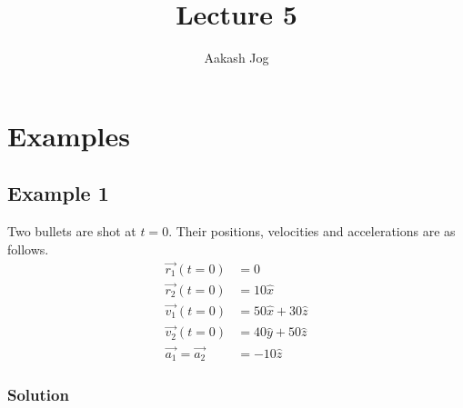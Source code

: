 \documentclass[fleqn]{article}
\title{Lecture 5}
\author{Aakash Jog}
\date{\formatdate{11}{11}{2014}}
\begin{document}
\maketitle

\tableofcontents

\newpage
\section{Examples}

\subsection{Example 1}

Two bullets are shot at $t=0$. Their positions, velocities and accelerations are as follows.
\begin{align*}
	\overrightarrow{r_1}(t=0) &= 0 \\
	\overrightarrow{r_2}(t=0) &= 10 \hat{x} \\
	\overrightarrow{v_1} (t=0) &= 50 \hat{x} + 30 \hat{z} \\
	\overrightarrow{v_2} (t=0) &= 40 \hat{y} + 50 \hat{z} \\
	\overrightarrow{a_1} = \overrightarrow{a_2} &= -10 \hat{z} 
\end{align*}

\subsubsection*{Solution}
\end{document}
